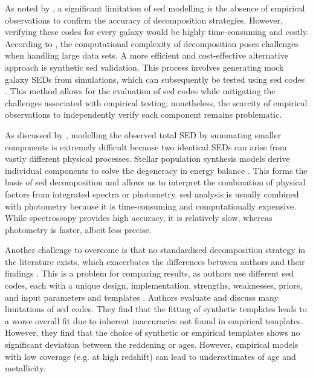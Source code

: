 As noted by \cite{hayward_should_2015}, a significant limitation of \gls{sed} modelling is the absence of empirical observations to confirm the accuracy of decomposition strategies. However, verifying these codes for every galaxy would be highly time-consuming and costly. According to \cite{silva_modelling_2011}, the computational complexity of decomposition poses challenges when handling large data sets. A more efficient and cost-effective alternative approach is synthetic \gls{sed} validation. This process involves generating mock galaxy SEDs from simulations, which can subsequently be tested using \gls{sed} codes \citep{walcher_fitting_2011, conroy_modeling_2013, hayward_should_2015, coelho_use_2020}. This method allows for the evaluation of \gls{sed} codes while mitigating the challenges associated with empirical testing; nonetheless, the scarcity of empirical observations to independently verify each component remains problematic.

As discussed by \cite{boquien_cigale_2019}, modelling the observed total SED by summating smaller components is extremely difficult because two identical SEDs can arise from vastly different physical processes. Stellar population synthesis models derive individual components to solve the degeneracy in energy balance \citep{coelho_use_2020}. This forms the basis of \gls{sed} decomposition and allows us to interpret the combination of physical factors from integrated spectra or photometry. \gls{sed} analysis is usually combined with photometry because it is time-consuming and computationally expensive. While spectroscopy provides high accuracy, it is relatively slow, whereas photometry is faster, albeit less precise.

Another challenge to overcome is that no standardised decomposition strategy in the literature exists, which exacerbates the differences between authors and their findings \citep{wu_mid-infrared_2011}. This is a problem for comparing results, as authors use different \gls{sed} codes, each with a unique design, implementation, strengths, weaknesses, priors, and input parameters and templates \citep{bellstedt_progeny_2024, mosleh_reconstructing_2025}. Authors \cite{coelho_use_2020} evaluate and discuss many limitations of \gls{sed} codes. They find that the fitting of synthetic templates leads to a worse overall fit due to inherent inaccuracies not found in empirical templates. However, they find that the choice of synthetic or empirical templates shows no significant deviation between the reddening or ages. However, empirical models with low coverage (e.g. at high redshift) can lead to underestimates of age and metallicity. 

